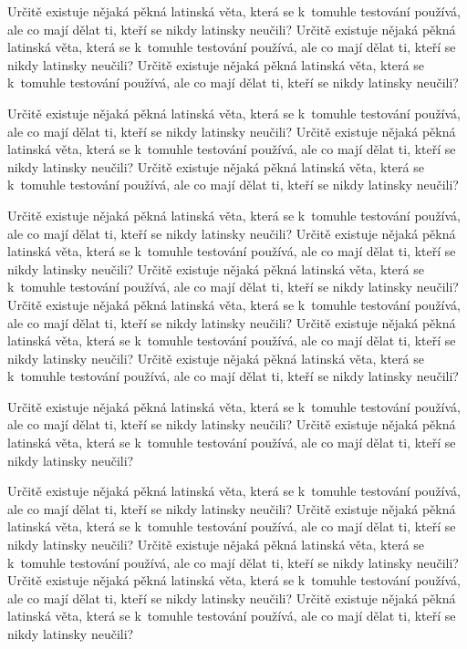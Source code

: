 \documentclass[11pt,twoside,a4paper]{book}
\begin{document}
Určitě existuje nějaká pěkná latinská věta, která se k~tomuhle testování používá, ale co mají dělat ti, kteří se nikdy
latinsky neučili? Určitě existuje nějaká pěkná latinská věta, která se k~tomuhle testování používá, ale co mají dělat
ti, kteří se nikdy latinsky neučili? Určitě existuje nějaká pěkná latinská věta, která se k~tomuhle testování používá,
ale co mají dělat ti, kteří se nikdy latinsky neučili?

Určitě existuje nějaká pěkná latinská věta, která se k~tomuhle testování používá, ale co mají dělat ti, kteří se nikdy
latinsky neučili? Určitě existuje nějaká pěkná latinská věta, která se k~tomuhle testování používá, ale co mají dělat
ti, kteří se nikdy latinsky neučili? Určitě existuje nějaká pěkná latinská věta, která se k~tomuhle testování používá,
ale co mají dělat ti, kteří se nikdy latinsky neučili?

Určitě existuje nějaká pěkná latinská věta, která se k~tomuhle testování používá, ale co mají dělat ti, kteří se nikdy
latinsky neučili? Určitě existuje nějaká pěkná latinská věta, která se k~tomuhle testování používá, ale co mají dělat
ti, kteří se nikdy latinsky neučili? Určitě existuje nějaká pěkná latinská věta, která se k~tomuhle testování používá,
ale co mají dělat ti, kteří se nikdy latinsky neučili? Určitě existuje nějaká pěkná latinská věta, která se k~tomuhle
testování používá, ale co mají dělat ti, kteří se nikdy latinsky neučili? Určitě existuje nějaká pěkná latinská věta,
která se k~tomuhle testování používá, ale co mají dělat ti, kteří se nikdy latinsky neučili? Určitě existuje nějaká
pěkná latinská věta, která se k~tomuhle testování používá, ale co mají dělat ti, kteří se nikdy latinsky neučili?

Určitě existuje nějaká pěkná latinská věta, která se k~tomuhle testování používá, ale co mají dělat ti, kteří se nikdy
latinsky neučili? Určitě existuje nějaká pěkná latinská věta, která se k~tomuhle testování používá, ale co mají dělat
ti, kteří se nikdy latinsky neučili?

Určitě existuje nějaká pěkná latinská věta, která se k~tomuhle testování používá, ale co mají dělat ti, kteří se nikdy
latinsky neučili? Určitě existuje nějaká pěkná latinská věta, která se k~tomuhle testování používá, ale co mají dělat
ti, kteří se nikdy latinsky neučili? Určitě existuje nějaká pěkná latinská věta, která se k~tomuhle testování používá,
ale co mají dělat ti, kteří se nikdy latinsky neučili? Určitě existuje nějaká pěkná latinská věta, která se k~tomuhle
testování používá, ale co mají dělat ti, kteří se nikdy latinsky neučili? Určitě existuje nějaká pěkná latinská věta,
která se k~tomuhle testování používá, ale co mají dělat ti, kteří se nikdy latinsky neučili?
\end{document}
